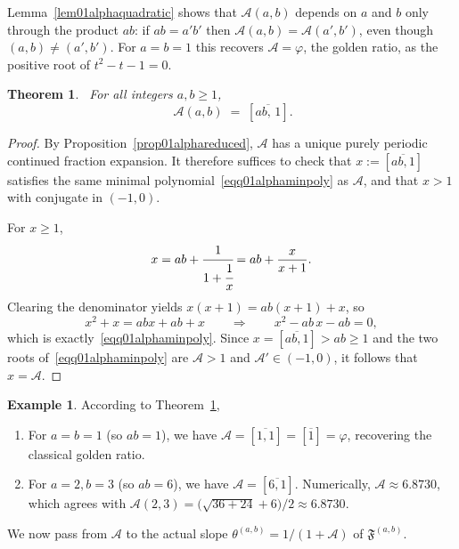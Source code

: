 \documentclass[12pt]{amsart}
\theoremstyle{plain}
\newtheorem{theorem}{Theorem}[section]
\theoremstyle{definition}
\newtheorem{example}{Example}
\theoremstyle{remark}
\newcommand{\AlphA}{\mathcal{A}}
\newcommand{\FD}{\mathfrak{F}}
\begin{document}
Lemma~\ref{lem01alphaquadratic} shows that $\AlphA (a,b)$ depends on
$a$ and $b$ only through the product $ab$: if $ab=a'b'$ then
$\AlphA (a,b)=\AlphA (a',b')$, even though $(a,b)\neq(a',b')$. For
$a=b=1$ this recovers $\AlphA =\varphi$, the golden ratio, as the
positive root of $t^2-t-1=0$.

\begin{theorem}~\label{thm01alphacf}
For all integers $a,b\geqslant 1$,
\begin{equation}~\label{eq01alphacf}
  \AlphA (a,b) \;=\; [\overline{ab,\,1}].
\end{equation}
\end{theorem}
\begin{proof}
By Proposition~\ref{prop01alphareduced}, $\AlphA $ has a unique
purely periodic continued fraction expansion. It therefore suffices
to check that $x:=[\overline{ab,1}]$ satisfies the same minimal
polynomial~\eqref{eqq01alphaminpoly} as $\AlphA $, and that $x>1$ with
conjugate in $(-1,0)$.

For $x\geqslant 1$, 
\[
  x = ab + \cfrac{1}{1+\cfrac{1}{x}} = ab+\frac{x}{x+1}.
\]
Clearing the denominator yields $x(x+1) = ab(x+1) + x$, so 
\[
  x^2 + x = abx + ab + x \qquad \Longrightarrow \qquad x^2 - ab\,x - ab = 0,
\]
which is exactly~\eqref{eqq01alphaminpoly}. Since $x=[\overline{ab,1}]>ab\ge1$
and the two roots of~\eqref{eqq01alphaminpoly} are $\AlphA >1$ and
$\AlphA '\in(-1,0)$, it follows that $x=\AlphA $.
\end{proof}

\begin{example}
According to Theorem~\ref{thm01alphacf}, 
\begin{enumerate}
    \item For $a=b=1$ (so $ab=1$), we have $\AlphA =[\overline{1,1}]=[\overline{1}]=\varphi$,
recovering the classical golden ratio.
    \item For $a=2,b=3$ (so $ab=6$), we have $\AlphA =[\overline{6,1}]$. Numerically,
$\AlphA \approx 6.8730$, which agrees with
$\AlphA (2,3)=\bigl(\sqrt{36+24}+6\bigr)/2\approx 6.8730$.
\end{enumerate}
\end{example}

We now pass from $\AlphA $ to the actual slope $\theta^{(a,b)}=1/(1+\AlphA )$
of $\FD^{(a,b)}$.
\end{document}
